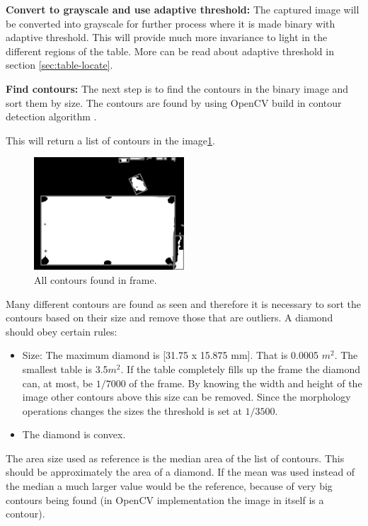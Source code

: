 \textbf{Convert to grayscale and use adaptive threshold:}
The captured image will be converted into grayscale for further process where it is made binary with adaptive threshold. This will provide much more invariance to light in the different regions of the table. More can be read about adaptive threshold in section \ref{sec:table-locate}.


\textbf{Find contours:}
The next step is to find the contours in the binary image and sort them by size. The contours are found by using OpenCV build in contour detection algorithm \cite{contour}.

This will return a list of contours in the image\ref{fig:allcontours}.

\begin{figure}[htb]
\begin{center}
\leavevmode
\includegraphics[width=0.5\textwidth]{images/allcontours.png}
\end{center}
\caption{All contours found in frame.}
\label{fig:allcontours}
\end{figure}

Many different contours are found as seen and therefore it is necessary to sort the contours based on their size and remove those that are outliers. A diamond should obey certain rules:

\begin{itemize}
	\item Size: The maximum diamond is [31.75 x 15.875 mm]. That is 0.0005 $m^2$. The smallest table is 3.5$m^2$. If the table completely fills up the frame the diamond can, at most, be $1/7000$ of the frame. By knowing the width and height of the image other contours above this size can be removed. Since the morphology operations changes the sizes the threshold is set at $1/3500$.
	\item The diamond is convex.
\end{itemize}

The area size used as reference is the median area of the list of contours. This should be approximately the area of a diamond. If the mean was used instead of the median a much larger value would be the reference, because of very big contours being found (in OpenCV implementation the image in itself is a contour).

